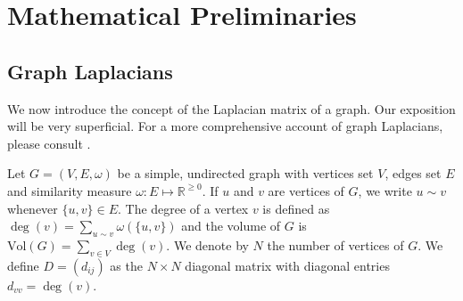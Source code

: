 \chapter{Mathematical Preliminaries}
\section{Graph Laplacians}
\label{sec:graph-laplacians}
We now introduce the concept of the Laplacian matrix of a graph. Our
exposition will be very superficial. For a more comprehensive account
of graph Laplacians, please consult \cite{chung05:_laplac_cheeg,cvetkovic80:_spect_graph_theor_applic}.

Let $G = (V,E,\omega)$ be a simple, undirected graph with vertices set
$V$, edges set $E$ and similarity measure $\omega \colon E \mapsto
\mathbb{R}^{\geq 0}$. If $u$ and $v$ are vertices of $G$, we write $u \sim v$
whenever $\{u,v\} \in E$. The degree of a vertex $v$ is defined as
$\deg(v) = \sum_{u \sim v}{\omega(\{u,v\})}$ and the volume of $G$ is
$\mathrm{Vol}(G) = \sum_{v \in V}{\deg(v)}$.  We denote by $N$ the
number of vertices of $G$. We define $D = (d_{ij})$ as the $N \times
N$ diagonal matrix with diagonal entries $d_{vv} = \deg(v)$.

